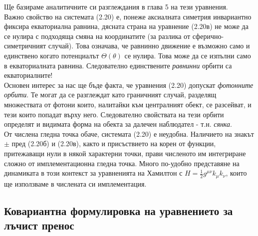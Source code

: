 Ще базираме аналитичните си разглеждания в глава 5 на тези уравнения.\\\newline
Важно свойство на системата (2.20) е, понеже аксиалната симетрия инвариантно фиксира екваториална равнина, дясната страна на уравнение (2.20в) не може да се нулира с подходяща смяна на координатите (за разлика от сферично-симетричният случай). Това означава, че равнинно движение е възможно само и единствено когато потенциалът $\Theta(\theta)$ се нулира. Това може да се изпълни само в екваториалната равнина. Следователно единствените \emph{равнинни} орбити са екваториалните!\\

Основен интерес за нас ще бъде факта, че уравнения (2.20) допускат \emph{фотонните орбити}. Те могат да се разглеждат като граничният случай, разделящ множествата от фотони които, налитайки към централният обект, се разсейват, и тези които попадат върху него. Следователно свойствата на тези орбити определят и видимата форма на обекта за далечен наблюдател - т.н. \emph{сянка}.\\\newline
{}
От числена гледна точка обаче, системата (2.20) е неудобна. Наличието на знакът $\pm$ пред (2.20б) и (2.20в), както и присъствието на корен от функции, притежаващи нули в някой характерни точки, прави численото им интегриране сложно от имплементационна гледна точка. Много по-удобно представяне на динамиката в този контекст за уравненията на Хамилтон с $H = \frac{1}{2}g^{\mu\nu}k_\mu k_\nu$, които ще използваме в числената си имплементация.
\lfoot{}
\subsection{Ковариантна формулировка на уравнението за лъчист пренос}

